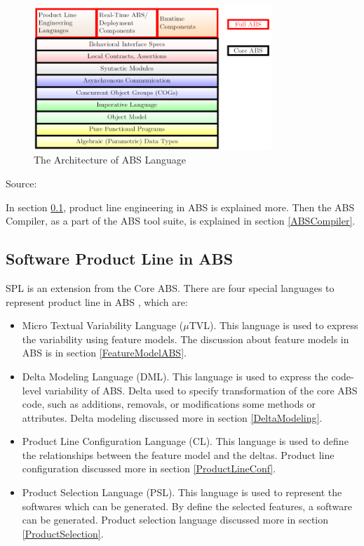 \begin{figure}
	\centering
	\includegraphics[width=0.8\textwidth]
		{pics/ArchitectureOfABS.png}
	\caption{The Architecture of ABS Language}
	\label{fig:ArchitectureOfABS}
\end{figure}
\vspace{-1cm}
\begin{center}
	{\small Source: \citep{paper.hanle.ABStutorial}}
\end{center}

In section \ref{SPLABS}, product line engineering in ABS is explained more. Then the ABS Compiler, as a part of the ABS tool suite, is explained in section \ref{ABSCompiler}.

\subsection{Software Product Line in ABS}\label{SPLABS}
SPL is an extension from the Core ABS. There are four special languages to represent product line in ABS \citep{paper.clarke.variability,paper.hanle.ABStutorial}, which are:
\begin{itemize}
	\item Micro Textual Variability Language ($\mu$TVL).
	This language is used to express the variability using feature models. The discussion about feature models in ABS is in section \ref{FeatureModelABS}.
	
	\item Delta Modeling Language (DML).
	This language is used to express the code-level variability of ABS. Delta used to specify transformation of the core ABS code, such as additions, removals, or modifications some methods or attributes. Delta modeling discussed more in section \ref{DeltaModeling}.
	
	\item Product Line Configuration Language (CL).
	This language is used to define the relationships between the feature model and the deltas. Product line configuration discussed more in section \ref{ProductLineConf}.
	
	\item Product Selection Language (PSL).
	This language is used to represent the softwares which can be generated. By define the selected features, a software can be generated. Product selection language discussed more in section \ref{ProductSelection}.
\end{itemize}

